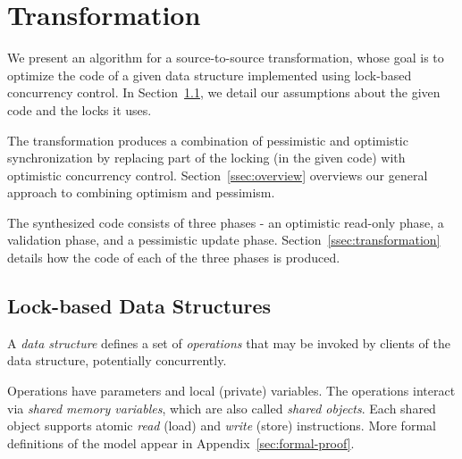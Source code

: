 \renewcommand{\ttdefault}{pcr}
\algrenewcommand{}
\algrenewcommand{}
\algrenewcommand{}
\algrenewcommand{}
\algrenewcommand{}
\algrenewcommand\textproc{\textit}
\newcommand{\codesize}{\footnotesize}



\section{Transformation}\label{sec:algorithm}

We present an algorithm for a source-to-source transformation, whose
goal is to optimize the code of a given data structure implemented using lock-based concurrency control.
In Section~\ref{ssec:locks}, we detail our assumptions about the given code and the locks it uses.

The transformation produces a combination of pessimistic and optimistic synchronization
by replacing part of the locking (in the given code) with optimistic concurrency control.
Section~\ref{ssec:overview} overviews our general approach to combining optimism and pessimism.

The synthesized code consists of three phases - an optimistic read-only phase, a validation phase,
and a pessimistic update phase. 
Section~\ref{ssec:transformation} details how the code of each of the three phases is produced.

\subsection{Lock-based Data Structures}\label{ssec:locks}

A \emph{data structure} defines a set of \emph{operations} that may be invoked by
clients of the data structure, potentially concurrently.

Operations have parameters and local (private) variables. %
%
The operations interact via \emph{shared memory variables}, which are also called \emph{shared objects}.
%
Each shared object supports atomic \emph{read} (load) and \emph{write} (store) instructions.
%
More formal definitions of the model appear in Appendix~\ref{sec:formal-proof}. 

